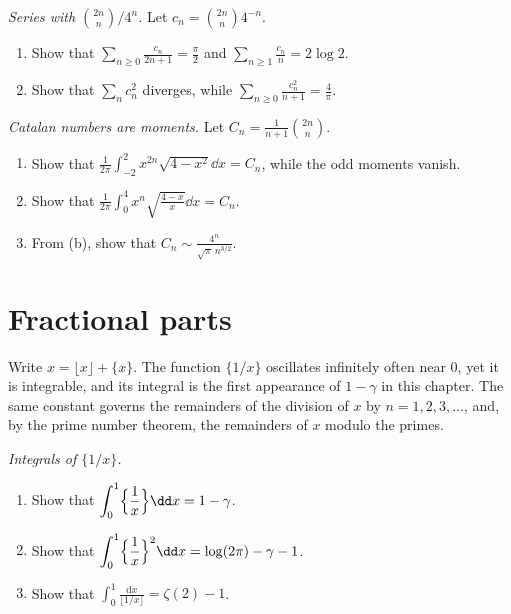 \begin{exercise}[$\star$]\label{pb:lehmer}
\emph{Series with $\binom{2n}n/4^n$.} Let $c_n=\binom{2n}n4^{-n}$.
\begin{enumerate}[label=(\alph*)]
\item Show that $\displaystyle\sum_{n\ge0}\frac{c_n}{2n+1}=\frac\pi2$ and $\displaystyle\sum_{n\ge1}\frac{c_n}n=2\log2$.
\item Show that $\sum_nc_n^2$ diverges, while $\displaystyle\sum_{n\ge0}\frac{c_n^2}{n+1}=\frac4\pi$.
\end{enumerate}
\end{exercise}

\begin{exercise}[$\star\star$]\label{pb:catalanmoments}
\emph{Catalan numbers are moments.} Let $C_n=\frac1{n+1}\binom{2n}n$.
\begin{enumerate}[label=(\alph*)]
\item Show that $\displaystyle\frac1{2\pi}\int_{-2}^2x^{2n}\sqrt{4-x^2}\dd x=C_n$, while the odd moments vanish.
\item Show that $\displaystyle\frac1{2\pi}\int_0^4x^n\sqrt{\frac{4-x}x}\dd x=C_n$.
\item From (b), show that $C_n\sim\frac{4^n}{\sqrt\pi\,n^{3/2}}$.
\end{enumerate}
\end{exercise}

\section{Fractional parts}

Write $x=\lfloor x\rfloor+\{x\}$. The function $\{1/x\}$ oscillates infinitely often near $0$, yet it is integrable, and its integral
is the first appearance of $1-\gamma$ in this chapter. The same constant governs the remainders of the division of $x$ by
$n=1,2,3,\dots$, and, by the prime number theorem, the remainders of $x$ modulo the primes.

\begin{exercise}[$\star\star$]\label{pb:fracint}
\emph{Integrals of $\{1/x\}$.}
\begin{enumerate}[label=(\alph*)]
\item Show that $\displaystyle\int_0^1\Bigl\{\frac1x\Bigr\}\dd x=1-\gamma$.
\item Show that $\displaystyle\int_0^1\Bigl\{\frac1x\Bigr\}^2\dd x=\log(2\pi)-\gamma-1$.
\item Show that $\displaystyle\int_0^1\frac{\mathrm dx}{\lfloor1/x\rfloor}=\zeta(2)-1$.
\end{enumerate}
\end{exercise}

